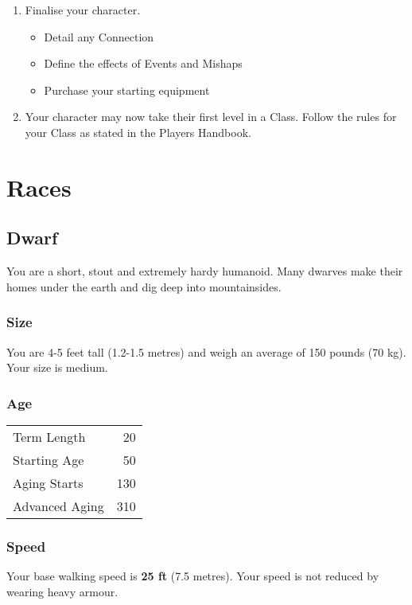 \documentclass[10pt,twoside]{article}
\begin{document}
\begin{multicols}{2}
\begin{enumerate}
\begin{itemize}
\end{itemize}
\item Finalise your character.
\begin{itemize}
\item Detail any Connection
\item Define the effects of Events and Mishaps
\item Purchase your starting equipment
\end{itemize}
\item Your character may now take their first level in a Class. Follow the rules for your Class as stated in the Players Handbook.
\end{enumerate}

\columnbreak

\section{Races}

\subsection{Dwarf}

You are a short, stout and extremely hardy humanoid. Many dwarves make their homes under the earth and dig deep into mountainsides.

\subsubsection*{Size}
You are 4-5 feet tall (1.2-1.5 metres) and weigh an average of 150 pounds (70 kg). Your size is medium.

\subsubsection*{Age}
\begin{tabular}{ l r }
  Term Length & 20 \\
  Starting Age & 50 \\
  Aging Starts & 130 \\
  Advanced Aging & 310 \\
\end{tabular}

\subsubsection*{Speed}
Your base walking speed is \textbf{25 ft} (7.5 metres). Your speed is not reduced by wearing heavy armour.


\end{multicols}
\end{document}
